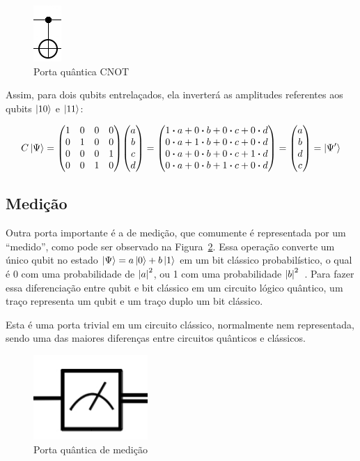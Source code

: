 \documentclass[a4paper, 12pt, oneside]{book}
\begin{document}
\begin{figure}[H]
\centering
\includegraphics[scale=0.80]{cnot.png}
\caption{Porta quântica CNOT}
\label{fig:CNOT}
\end{figure}

Assim, para dois qubits entrelaçados, ela inverterá as amplitudes referentes aos qubits $\ket{10}$ e $\ket{11}$:

\begin{equation}\label{eqFullCNOT}
C\ket{\Psi} = \mqty(1&0&0&0\\0&1&0&0\\0&0&0&1\\0&0&1&0)\mqty(a\\b\\c\\d) = 
\mqty(1 \vdot a+0 \vdot b +0 \vdot c +0 \vdot d \\
	  0 \vdot a+1 \vdot b +0 \vdot c +0 \vdot d \\
	  0 \vdot a+0 \vdot b +0 \vdot c +1 \vdot d \\
	  0 \vdot a+0 \vdot b +1 \vdot c +0 \vdot d ) 
= \mqty(a\\b\\d\\c) = \ket{\Psi'}
\end{equation}

\subsection{Medição} \label{sec:medicao}
Outra porta importante é a de medição, que comumente é representada por um ``medido'', como pode ser observado na Figura~\ref{fig:medicao}. Essa operação converte um único qubit no estado $\ket{\Psi}=a\ket{0}+b\ket{1}$ em um bit clássico probabilístico, o qual é 0 com uma probabilidade de $\abs{a}^2$, ou 1 com uma probabilidade $\abs{b}^2$~\cite{mermin}. Para fazer essa diferenciação entre qubit e bit clássico em um circuito lógico quântico, um traço representa um qubit e um traço duplo um bit clássico.

Esta é uma porta trivial em um circuito clássico, normalmente nem representada, sendo uma das maiores diferenças entre circuitos quânticos e clássicos.

\begin{figure}[H]
\centering
\includegraphics[scale=0.40]{medicao.png}
\caption{Porta quântica de medição}
\label{fig:medicao}
\end{figure}
\end{document}
